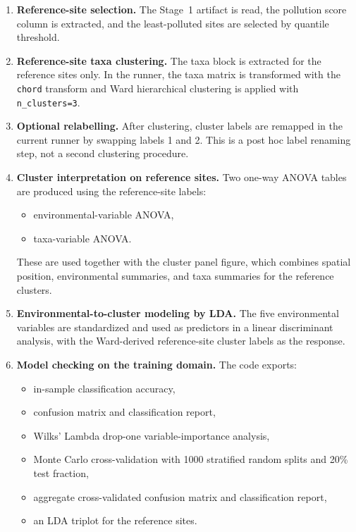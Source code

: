 \documentclass[11pt]{article}
\begin{document}
\begin{enumerate}[leftmargin=*]
  \item \textbf{Reference-site selection.}
  The Stage~1 artifact is read, the pollution score column is extracted, and the least-polluted sites are selected by quantile threshold.

  \item \textbf{Reference-site taxa clustering.}
  The taxa block is extracted for the reference sites only. In the runner, the taxa matrix is transformed with the \texttt{chord} transform and Ward hierarchical clustering is applied with \texttt{n\_clusters=3}.

  \item \textbf{Optional relabelling.}
  After clustering, cluster labels are remapped in the current runner by swapping labels 1 and 2. This is a post hoc label renaming step, not a second clustering procedure.

  \item \textbf{Cluster interpretation on reference sites.}
  Two one-way ANOVA tables are produced using the reference-site labels:
  \begin{itemize}[leftmargin=*]
    \item environmental-variable ANOVA,
    \item taxa-variable ANOVA.
  \end{itemize}
  These are used together with the cluster panel figure, which combines spatial position, environmental summaries, and taxa summaries for the reference clusters.

  \item \textbf{Environmental-to-cluster modeling by LDA.}
  The five environmental variables are standardized and used as predictors in a linear discriminant analysis, with the Ward-derived reference-site cluster labels as the response.

  \item \textbf{Model checking on the training domain.}
  The code exports:
  \begin{itemize}[leftmargin=*]
    \item in-sample classification accuracy,
    \item confusion matrix and classification report,
    \item Wilks' Lambda drop-one variable-importance analysis,
    \item Monte Carlo cross-validation with 1000 stratified random splits and 20\% test fraction,
    \item aggregate cross-validated confusion matrix and classification report,
    \item an LDA triplot for the reference sites.
  \end{itemize}


\end{enumerate}
\end{document}
